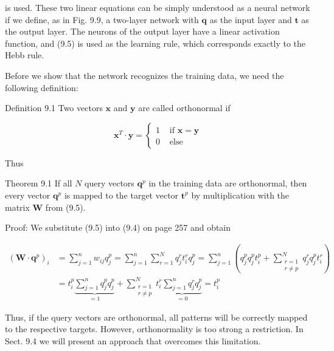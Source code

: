 \documentclass[10pt]{book}
\begin{document}
\begin{center}
\begin{enumerate}
\begin{center}
\begin{center}
\begin{center}
is used. These two linear equations can be simply understood as a neural network if we define, as in Fig. 9.9, a two-layer network with $\boldsymbol{q}$ as the input layer and $\boldsymbol{t}$ as the output layer. The neurons of the output layer have a linear activation function, and (9.5) is used as the learning rule, which corresponds exactly to the Hebb rule.

Before we show that the network recognizes the training data, we need the following definition:

Definition 9.1 Two vectors $\boldsymbol{x}$ and $\boldsymbol{y}$ are called orthonormal if

$$
\boldsymbol{x}^{T} \cdot \boldsymbol{y}= \begin{cases}1 & \text { if } \boldsymbol{x}=\boldsymbol{y} \\ 0 & \text { else }\end{cases}
$$

Thus

Theorem 9.1 If all $N$ query vectors $\boldsymbol{q}^{p}$ in the training data are orthonormal, then every vector $\boldsymbol{q}^{p}$ is mapped to the target vector $\boldsymbol{t}^{p}$ by multiplication with the matrix $\boldsymbol{W}$ from (9.5).

Proof: We substitute (9.5) into (9.4) on page 257 and obtain

$$
\begin{aligned}
\left(\boldsymbol{W} \cdot \boldsymbol{q}^{p}\right)_{i} & =\sum_{j=1}^{n} w_{i j} q_{j}^{p}=\sum_{j=1}^{n} \sum_{r=1}^{N} q_{j}^{r} t_{i}^{r} q_{j}^{p}=\sum_{j=1}^{n}\left(q_{j}^{p} q_{j}^{p} t_{i}^{p}+\sum_{\substack{r=1 \\
r \neq p}}^{N} q_{j}^{r} q_{j}^{p} t_{i}^{r}\right) \\
& =t_{i}^{p} \underbrace{\sum_{j=1}^{n} q_{j}^{p} q_{j}^{p}}_{=1}+\sum_{\substack{r=1 \\
r \neq p}}^{N} t_{i}^{r} \underbrace{\sum_{j=1}^{n} q_{j}^{r} q_{j}^{p}}_{=0}=t_{i}^{p}
\end{aligned}
$$

Thus, if the query vectors are orthonormal, all patterns will be correctly mapped to the respective targets. However, orthonormality is too strong a restriction. In Sect. 9.4 we will present an approach that overcomes this limitation.


\end{center}
\end{center}
\end{center}
\end{enumerate}
\end{center}
\end{document}
